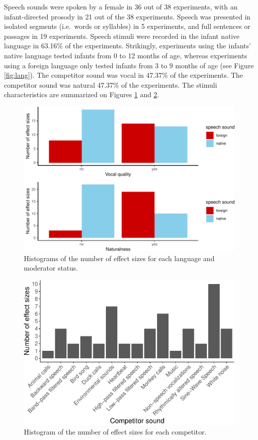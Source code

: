 \documentclass[
  english,
  man]{apa6}
\begin{document}
Speech sounds were spoken by a female in 36 out of 38 experiments, with an infant-directed prosody in 21 out of the 38 experiments. Speech was presented in isolated segments (i.e.~words or syllables) in 5 experiments, and full sentences or passages in 19 experiments. Speech stimuli were recorded in the infant native language in 63.16\% of the experiments. Strikingly, experiments using the infants' native language tested infants from 0 to 12 months of age, whereas experiments using a foreign language only tested infants from 3 to 9 months of age (see Figure \ref{fig:lang}).
The competitor sound was vocal in 47.37\% of the experiments. The competitor sound was natural 47.37\% of the experiments.
The stimuli characteristics are summarized on Figures \ref{fig:stimuli} and \ref{fig:competitors}.

\begin{figure}
\centering
\includegraphics{MA_speech_pref_files/figure-latex/stimuli-1.pdf}
\caption{\label{fig:stimuli}Histograms of the number of effect sizes for each language and moderator status.}
\end{figure}

\begin{figure}
\centering
\includegraphics{MA_speech_pref_files/figure-latex/competitors-1.pdf}
\caption{\label{fig:competitors}Histogram of the number of effect sizes for each competitor.}
\end{figure}
\end{document}
